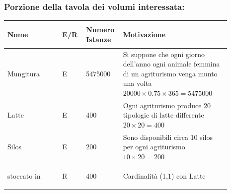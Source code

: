 \documentclass[12pt,a4paper]{article}
\begin{document}
\subsubsection*{Porzione della tavola dei volumi interessata:}
\begin{center}\setlength{\extrarowheight}{1.5pt}\begin{longtable}{|p{0.23\linewidth}|p{0.1\linewidth}|p{0.11\linewidth}|p{0.45\linewidth}|}
\hline \textbf{Nome}   & \begin{center}\vspace{-15pt}\textbf{E/R}\end{center} & \textbf{Numero Istanze} & \textbf{Motivazione}\\ 
\hline
Mungitura 				& \begin{center}
\vspace{-25pt}E
\end{center}
					& \begin{center}
					\vspace{-25pt}5475000\end{center}
					&  Si suppone che ogni giorno dell'anno ogni animale femmina di un agriturismo venga munto una volta $20000\times 0.75 \times 365 = 5475000$ \\ 

\hline
Latte 				& \begin{center}
\vspace{-25pt}E
\end{center}
					& \begin{center}
					\vspace{-25pt}400\end{center}
					&  Ogni agriturismo produce 20 tipologie di latte differente $20\times 20 = 400$\\ 

\hline
Silos 				& \begin{center}
\vspace{-25pt}E
\end{center}
					& \begin{center}
					\vspace{-25pt}200\end{center}
					&  Sono disponibili circa 10 silos per ogni agriturismo $10\times 20=200$ \\ 

\hline
stoccato in 				& \begin{center}
\vspace{-25pt}R
\end{center}
					& \begin{center}
					\vspace{-25pt}400\end{center}
					&  Cardinalità (1,1) con Latte \\ 

\hline

\end{longtable}\end{center}
\end{document}
